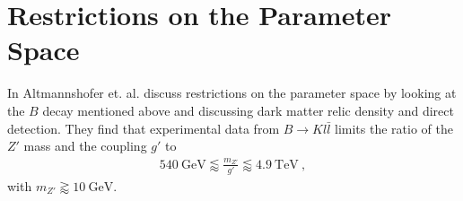 
\section{Restrictions on the Parameter Space\label{sec:ParamSpace}}
In \cite{Z} Altmannshofer et. al. discuss restrictions on the parameter space by looking at the $B$ decay mentioned above and discussing dark matter relic density and direct detection. They find that experimental data from $B\rightarrow Kl\bar{l}$ limits the ratio of the $Z'$ mass and the coupling $g'$ to
\begin{align}\label{eq:BoundBS}
	\SI{540}{\giga\electronvolt}\lessapprox\frac{m_{Z'}}{g'}\lessapprox\SI{4.9}{\tera\electronvolt} \ ,
\end{align}
with $m_{Z'}\gtrapprox\SI{10}{\giga\electronvolt}$.


